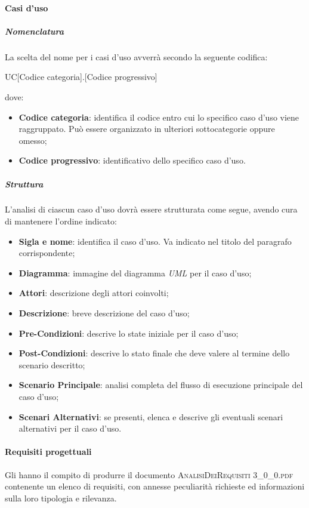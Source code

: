 		\paragraph{Casi d'uso}
		
			\subparagraph{Nomenclatura}
			La scelta del nome per i casi d'uso avverrà secondo la seguente codifica:
			\begin{center}
				UC[Codice categoria].[Codice progressivo]
			\end{center}
			dove:
			\begin{itemize}
				\item\textbf{Codice categoria}: identifica il codice entro cui lo specifico caso d'uso viene raggruppato. Può essere organizzato in ulteriori sottocategorie oppure omesso;
				\item\textbf{Codice progressivo}: identificativo dello specifico caso d'uso.
			\end{itemize}
			
			\subparagraph{Struttura}
			L'analisi di ciascun caso d'uso dovrà essere strutturata come segue, avendo cura di mantenere l'ordine indicato:
			\begin{itemize}
				\item\textbf{Sigla e nome}: identifica il caso d'uso. Va indicato nel titolo del paragrafo corrispondente;
				\item\textbf{Diagramma}: immagine del diagramma \textit{UML} per il caso d'uso;
				\item\textbf{Attori}: descrizione degli attori coinvolti;
				\item\textbf{Descrizione}: breve descrizione del caso d'uso;
				\item\textbf{Pre-Condizioni}: descrive lo state iniziale per il caso d'uso;
				\item\textbf{Post-Condizioni}: descrive lo stato finale che deve valere al termine dello scenario descritto;
				\item\textbf{Scenario Principale}: analisi completa del flusso di esecuzione principale del caso d'uso;
				\item\textbf{Scenari Alternativi}: se presenti, elenca e descrive gli eventuali scenari alternativi per il caso d'uso.
			\end{itemize}
		
		\paragraph{Requisiti progettuali}
		Gli \textit{\Anas} hanno il compito di produrre il documento \textsc{AnalisiDeiRequisiti 3\_0\_0.pdf} contenente un elenco di requisiti, con annesse peculiarità richieste ed informazioni sulla loro tipologia e rilevanza.
		
